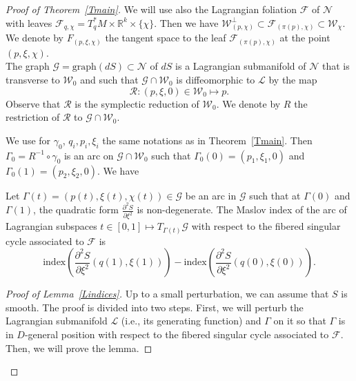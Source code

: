 \documentclass[AHL, Unicode, longabstracts, published]{cedram}
\newcommand*\cF{\mathcal{F}}
\newcommand*\cg{\mathcal{G}}
\newcommand*\cl{\mathcal{L}}
\newcommand*\cN{\mathcal{N}}
\newcommand*\cR{\mathcal{R}}
\newcommand*\cw{\mathcal{W}}
\newcommand{\Graph}{\mathrm{graph}}
\newcommand*\R{\mathbb{R}}
\begin{document}
\begin{proof}[Proof of Theorem~\ref{Tmain}]
We will use also the Lagrangian foliation $\cF$ of $\cN$ with leaves $\cF_{q,\chi}=T^*_qM\times \R^k\times \{ \chi\}$. Then we have $\cw^\bot_{(p,\chi)} \subset \cF_{(\pi(p),\chi)}\subset \cw_\chi$. We denote by $F_{(p,\xi, \chi)}$ the tangent space to the leaf $\cF_{(\pi(p),\chi)}$ at the point $(p,\xi, \chi)$.\\
The graph $ \cg= \Graph(dS)\subset \cN$ of $dS$ is a Lagrangian submanifold of $\cN$ that is transverse to $\cw_0$ and such that $\cg\cap \cw_0$ is diffeomorphic to $\cl$ by the map
\[
\cR:(p, \xi, 0)\in \cw_0\mapsto p.
\]
Observe that $\cR$ is the symplectic reduction of $\cw_0$. We denote by $R$ the restriction of $\cR$ to $\cg\cap \cw_0$.

We use for $\gamma_0$, $q_i, p_i, \xi_i$ the same notations as in Theorem~\ref{Tmain}. Then $\Gamma_0=R^{-1}\circ \gamma_0$ is an arc on $\cg\cap \cw_0$ such that $\Gamma_0(0)=(p_1, \xi_1, 0)$ and $\Gamma_0 (1)=(p_2, \xi_2, 0)$. We have

\begin{lemm}\label{Lindices}
Let $\Gamma(t)=(p(t), \xi(t), \chi(t))\in \cg$ be an arc in $\cg$ such that at $\Gamma(0)$ and $\Gamma(1)$, the quadratic form $\frac{\partial^2 S}{\partial \xi^2}$ is non-degenerate. The Maslov index of the arc of Lagrangian subspaces $t\in[0, 1]\mapsto T_{\Gamma(t)}\cg$ with respect to the fibered singular cycle associated to $\cF$
is
\[
\text{index}\left(\frac{\partial^2 S}{\partial \xi^2}(q(1), \xi(1))\right)-\text{index}\left(\frac{\partial^2 S}{\partial \xi^2}(q(0), \xi(0))\right).
\]
\end{lemm}


\begin{proof}[Proof of Lemma~\ref{Lindices}]
Up to a small perturbation, we can assume that $S$ is smooth. The proof is divided into two steps. First, we will perturb the Lagrangian submanifold $\cl$ (i.e., its generating function) and $\Gamma$ on it so that $\Gamma$ is in $D$-general position with respect to the fibered singular cycle associated to $\cF$. Then, we will prove the lemma. 


\end{proof}
\end{proof}
\end{document}
